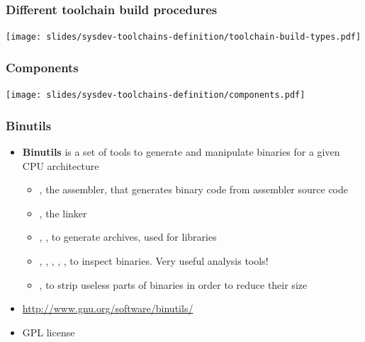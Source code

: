 \begin{frame}
  \frametitle{Different toolchain build procedures}
  \begin{center}
    \texttt{[image: slides/sysdev-toolchains-definition/toolchain-build-types.pdf]}
  \end{center}
\end{frame}

\begin{frame}
  \frametitle{Components}
  \begin{center}
    \texttt{[image: slides/sysdev-toolchains-definition/components.pdf]}
  \end{center}
\end{frame}

\begin{frame}
  \frametitle{Binutils}
  \begin{itemize}
  \item {\bf Binutils} is a set of tools to generate and manipulate
    binaries for a given CPU architecture
    \begin{itemize}
    \item {}, the assembler, that generates binary code from
      assembler source code
    \item {}, the linker
    \item {}, , to generate  archives,
      used for libraries
    \item {}, , , ,
      , to inspect binaries. Very useful analysis tools!
    \item {}, to strip useless parts of binaries in order to
      reduce their size
    \end{itemize}
  \item \url{http://www.gnu.org/software/binutils/}
  \item GPL license
  \end{itemize}
\end{frame}

